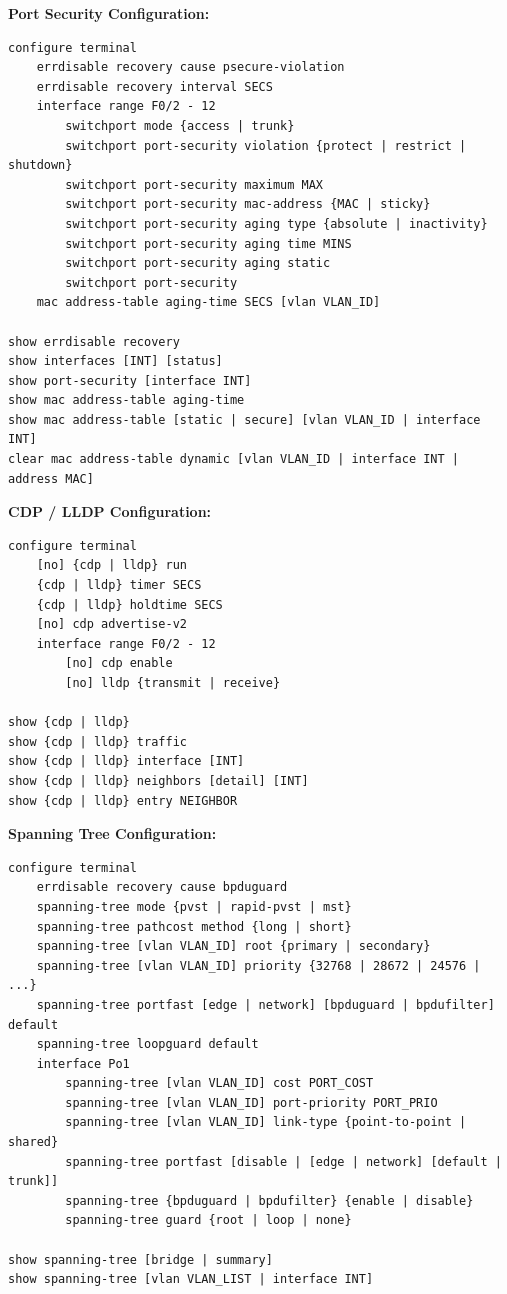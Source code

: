 \documentclass[12pt]{article}
\begin{document}
	\textbf{Port Security Configuration:}
	\begin{lstlisting}
configure terminal
	errdisable recovery cause psecure-violation
	errdisable recovery interval SECS
	interface range F0/2 - 12
		switchport mode {access | trunk}
		switchport port-security violation {protect | restrict | shutdown}
		switchport port-security maximum MAX
		switchport port-security mac-address {MAC | sticky}
		switchport port-security aging type {absolute | inactivity}
		switchport port-security aging time MINS
		switchport port-security aging static
		switchport port-security
	mac address-table aging-time SECS [vlan VLAN_ID]

show errdisable recovery
show interfaces [INT] [status]
show port-security [interface INT]
show mac address-table aging-time
show mac address-table [static | secure] [vlan VLAN_ID | interface INT]
clear mac address-table dynamic [vlan VLAN_ID | interface INT | address MAC]
	\end{lstlisting}

	\textbf{CDP / LLDP Configuration:}
	\begin{lstlisting}
configure terminal
	[no] {cdp | lldp} run
	{cdp | lldp} timer SECS
	{cdp | lldp} holdtime SECS
	[no] cdp advertise-v2
	interface range F0/2 - 12
		[no] cdp enable
		[no] lldp {transmit | receive}

show {cdp | lldp}
show {cdp | lldp} traffic
show {cdp | lldp} interface [INT]
show {cdp | lldp} neighbors [detail] [INT]
show {cdp | lldp} entry NEIGHBOR
	\end{lstlisting}

	\textbf{Spanning Tree Configuration:}
	\begin{lstlisting}
configure terminal
	errdisable recovery cause bpduguard
	spanning-tree mode {pvst | rapid-pvst | mst}
	spanning-tree pathcost method {long | short}
	spanning-tree [vlan VLAN_ID] root {primary | secondary}
	spanning-tree [vlan VLAN_ID] priority {32768 | 28672 | 24576 | ...}
	spanning-tree portfast [edge | network] [bpduguard | bpdufilter] default
	spanning-tree loopguard default
	interface Po1
		spanning-tree [vlan VLAN_ID] cost PORT_COST
		spanning-tree [vlan VLAN_ID] port-priority PORT_PRIO
		spanning-tree [vlan VLAN_ID] link-type {point-to-point | shared}
		spanning-tree portfast [disable | [edge | network] [default | trunk]]
		spanning-tree {bpduguard | bpdufilter} {enable | disable}
		spanning-tree guard {root | loop | none}

show spanning-tree [bridge | summary]
show spanning-tree [vlan VLAN_LIST | interface INT]
	\end{lstlisting}
\end{document}
